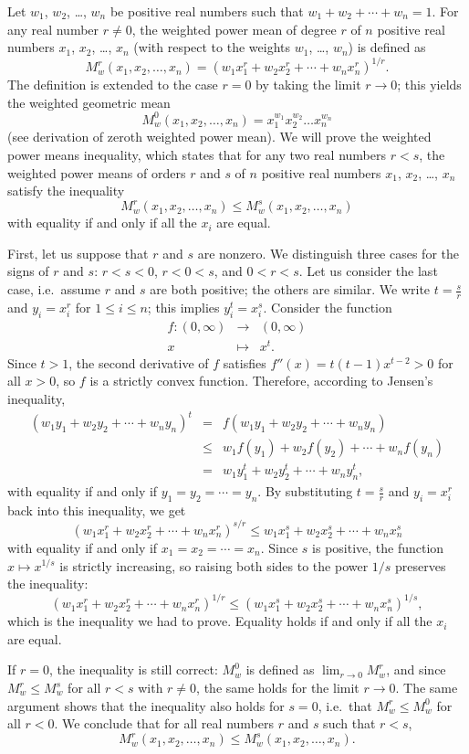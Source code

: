 \documentclass[12pt]{article}
\begin{document}
Let $w_1$, $w_2$, \dots, $w_n$ be positive real numbers such that
$w_1+w_2+\cdots+w_n=1$.  For any real number $r\ne0$, the
weighted power mean of degree $r$ of $n$ positive real numbers $x_1$,
$x_2$, \dots, $x_n$ (with respect to the weights $w_1$, \dots,
$w_n$) is defined as
$$
M_w^r(x_1,x_2,\ldots,x_n)=(w_1x_1^r+w_2x_2^r+\cdots+w_nx_n^r)^{1/r}.
$$
The definition is extended to the case $r=0$ by taking the limit
$r\to 0$; this yields the weighted geometric mean
$$
M_w^0(x_1,x_2,\ldots,x_n)=x_1^{w_1}x_2^{w_2}\ldots x_n^{w_n}
$$
(see derivation of zeroth weighted power mean).  We will prove the
weighted power means inequality, which states that for any two real
numbers $r<s$, the weighted power means of orders $r$ and $s$ 
of $n$ positive real numbers $x_1$, $x_2$, \dots, $x_n$ satisfy the 
inequality
$$
M_w^r(x_1,x_2,\ldots,x_n)\le M_w^s(x_1,x_2,\ldots,x_n)
$$
with equality if and only if all the $x_i$ are equal.

First, let us suppose that $r$ and $s$ are nonzero.  We
distinguish three cases for the signs of $r$ and $s$: $r<s<0$,
$r<0<s$, and $0<r<s$.  Let us consider the last case, i.e.\ assume
$r$ and $s$ are both positive; the others are similar.  We write
$t=\frac{s}{r}$ and $y_i=x_i^r$ for $1\le i\le n$; this implies
$y_i^t=x_i^s$.  Consider the function
\begin{eqnarray*}
f\colon(0,\infty)&\to&(0,\infty)\\
x&\mapsto&x^t.
\end{eqnarray*}
Since $t>1$, the second derivative of $f$ satisfies
$f''(x)=t(t-1)x^{t-2}>0$ for all $x>0$, so $f$ is a strictly
convex function.  Therefore, according to Jensen's inequality,
\begin{eqnarray*}
(w_1y_1+w_2y_2+\cdots+w_ny_n)^t&=&f(w_1y_1+w_2y_2+\cdots+w_ny_n)\\
&\le&w_1f(y_1)+w_2f(y_2)+\cdots+w_nf(y_n)\\
&=&w_1y_1^t+w_2y_2^t+\cdots+w_ny_n^t,
\end{eqnarray*}
with equality if and only if $y_1=y_2=\cdots=y_n$.  By substituting
$t=\frac{s}{r}$ and $y_i=x_i^r$ back into this inequality, we get
$$
(w_1x_1^r+w_2x_2^r+\cdots+w_nx_n^r)^{s/r}\le
w_1x_1^s+w_2x_2^s+\cdots+w_nx_n^s
$$
with equality if and only if $x_1=x_2=\cdots=x_n$.  Since $s$ is
positive, the function $x\mapsto x^{1/s}$ is strictly increasing, so
raising both sides to the power $1/s$ preserves the inequality:
$$
(w_1x_1^r+w_2x_2^r+\cdots+w_nx_n^r)^{1/r}\le
(w_1x_1^s+w_2x_2^s+\cdots+w_nx_n^s)^{1/s},
$$
which is the inequality we had to prove.  Equality holds if and only
if all the $x_i$ are equal.

If $r=0$, the inequality is still correct: $M_w^0$ is defined as
$\lim_{r\to 0}M_w^r$, and since $M_w^r\le M_w^s$ for all $r<s$ with
$r\neq 0$, the same holds for the limit $r\to 0$.  The same argument
shows that the inequality also holds for $s=0$, i.e.\ that
$M_w^r\le M_w^0$ for all $r<0$.  We conclude that for all real numbers
$r$ and $s$ such that $r<s$,
$$
M_w^r(x_1,x_2,\ldots,x_n)\le M_w^s(x_1,x_2,\ldots,x_n).
$$
\end{document}

